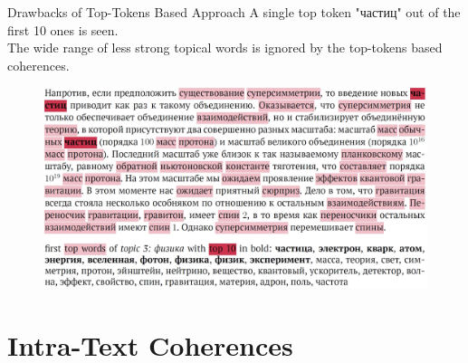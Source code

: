 \documentclass[russian]{beamer}
\begin{document}
\begin{frame}{Drawbacks of Top-Tokens Based Approach}
  A single top token "частиц" out of the first 10 ones is seen.\\
  The wide range of less strong topical words is ignored by the top-tokens based coherences.
  \begin{figure}[h]
    \centering
    \includegraphics[width=1.0\textwidth]{topwords-insufficient.jpg}
  \end{figure}
\end{frame}


\section{Intra-Text Coherences}
\end{document}
